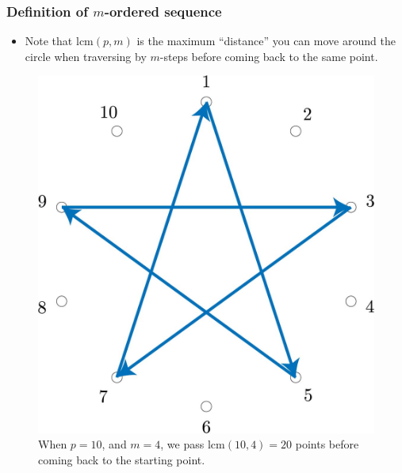 \documentclass{beamer}
\theoremstyle{plain}
\theoremstyle{definition}
\theoremstyle{remark}
\newcommand{\lcm}{\mathrm{lcm}}
\renewcommand{\'}{\hspace{0.5mm}'}		%
\begin{document}
\begin{frame}
\frametitle{Definition of $m$-ordered sequence}
	\begin{itemize}
		\item Note that $\mathrm{lcm}(p,m)$ is the 
		maximum ``distance'' you can move around the 
		circle when traversing by $m$-steps before
		coming back to the same point. 
	\end{itemize}
	\begin{figure}
		\includegraphics[scale=0.08]{circ_10_4.jpg}
		\caption{When $p = 10$, and $m = 4$, we 
		pass $\lcm(10,4) = 20$ points 
		before coming back to the starting point. }
	\end{figure}
	
\end{frame}

\end{document}
